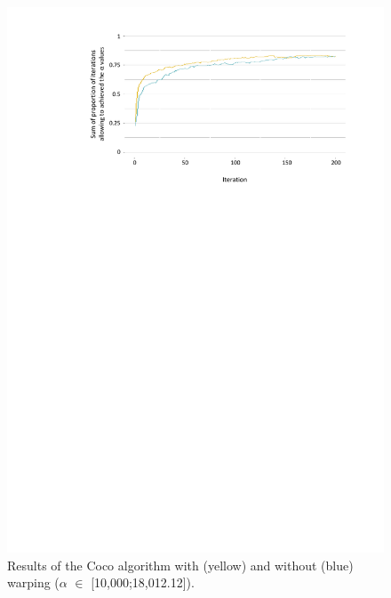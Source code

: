 	\begin{figure}[!ht]
	\centering
	\includegraphics[trim = 4cm 18.5cm 1.9cm 1.4cm, clip, width=\textwidth]{Figures_Warping_resultats_courbes_algoCoco_10000_18000.pdf}
	\caption{Results of the Coco algorithm with (yellow) and without (blue) warping ($\alpha$ $\in$ [10,000;18,012.12]).}\label{fig:algococo10000}
\end{figure}

